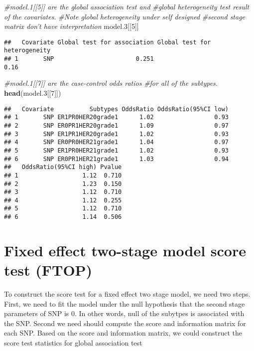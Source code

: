 \documentclass[11pt,]{article}
\newenvironment{Shaded}{\begin{snugshade}}{\end{snugshade}}
\newcommand{\KeywordTok}[1]{\textcolor[rgb]{0.13,0.29,0.53}{\textbf{#1}}}
\newcommand{\DecValTok}[1]{\textcolor[rgb]{0.00,0.00,0.81}{#1}}
\newcommand{\CommentTok}[1]{\textcolor[rgb]{0.56,0.35,0.01}{\textit{#1}}}
\newcommand{\NormalTok}[1]{#1}
\begin{document}
\begin{Shaded}
\begin{Highlighting}[]
\CommentTok{#model.1[[5]] are the global association test and }
\CommentTok{#global heterogeneity test result of the covariates.}
\CommentTok{#Note global heterogeneity under self designed}
\CommentTok{#second stage matrix don't have interpretation}
\NormalTok{model.}\DecValTok{3}\NormalTok{[[}\DecValTok{5}\NormalTok{]]}
\end{Highlighting}
\end{Shaded}

\begin{verbatim}
##   Covariate Global test for association Global test for heterogeneity
## 1       SNP                       0.251                          0.16
\end{verbatim}

\begin{Shaded}
\begin{Highlighting}[]
\CommentTok{#model.1[[7]] are the case-control odds ratios }
\CommentTok{#for all of the subtypes.}
\KeywordTok{head}\NormalTok{(model.}\DecValTok{3}\NormalTok{[[}\DecValTok{7}\NormalTok{]])}
\end{Highlighting}
\end{Shaded}

\begin{verbatim}
##   Covariate          Subtypes OddsRatio OddsRatio(95%CI low)
## 1       SNP ER1PR0HER20grade1      1.02                 0.93
## 2       SNP ER0PR1HER20grade1      1.09                 0.97
## 3       SNP ER1PR1HER20grade1      1.02                 0.93
## 4       SNP ER0PR0HER21grade1      1.04                 0.97
## 5       SNP ER1PR0HER21grade1      1.02                 0.93
## 6       SNP ER0PR1HER21grade1      1.03                 0.94
##   OddsRatio(95%CI high) Pvalue
## 1                  1.12  0.710
## 2                  1.23  0.150
## 3                  1.12  0.710
## 4                  1.12  0.255
## 5                  1.12  0.710
## 6                  1.14  0.506
\end{verbatim}

\section{Fixed effect two-stage model score test
(FTOP)}\label{fixed-effect-two-stage-model-score-test-ftop}

To construct the score test for a fixed effect two stage model, we need
two steps. First, we need to fit the model under the null hypothesis
that the second stage parameters of SNP is 0. In other words, null of
the subytpes is associated with the SNP. Second we need should compute
the score and information matrix for each SNP. Based on the score and
information matrix, we could construct the score test statistics for
global association test
\end{document}
